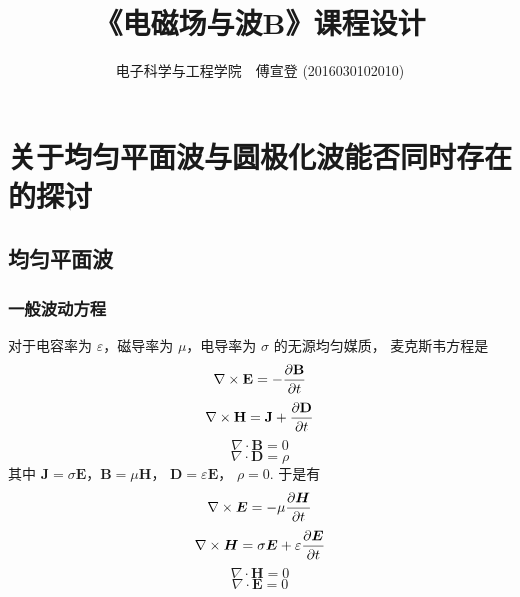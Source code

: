 \documentclass[UTF8,linespread=1.236]{ctexart}
\newcommand\cu[1]{\boldsymbol{#1}}
\newcommand\pypx[2]{{{\partial {#1}} \over {\partial {#2}}}}
\begin{document}
\title{《电磁场与波B》课程设计}
\author{电子科学与工程学院\ \ 傅宣登 (2016030102010)}

\maketitle

\section{关于均匀平面波与圆极化波能否同时存在的探讨}

\subsection{均匀平面波}

\subsubsection{一般波动方程}

对于电容率为 $\varepsilon$，磁导率为 $\mu$，电导率为 $\sigma$
的无源均匀媒质，
麦克斯韦方程是
\begin{equation}%
    \nabla \times \mathbf{E} = - \pypx{\mathbf{B}}{t}
\end{equation}
\begin{equation}
    \nabla \times \mathbf{H} = \mathbf{J} + \pypx{\mathbf{D}}{t}
\end{equation}
\begin{equation}
    \nabla \cdot \mathbf{B} = 0
\end{equation}
\begin{equation}
    \nabla \cdot \mathbf{D} = \rho
\end{equation}
其中 $\mathbf{J} = \sigma\mathbf{E}$，$\cu{B} = \mu\cu{H}$，
$\cu{D} = \varepsilon\cu{E}$，
$\rho = 0$. 于是有
\begin{equation}
    \label{eq81}
    \nabla \times \cu{E} = -\mu \pypx{\cu{H}}{t}
\end{equation}
\begin{equation}
    \label{eq82}
    \nabla \times \cu{H} = \sigma\cu{E} + \varepsilon\pypx{\cu{E}}{t}
\end{equation}
\begin{equation}
    \label{eq83}
    \nabla \cdot \cu{H} = 0
\end{equation}
\begin{equation}
    \label{eq84}
    \nabla \cdot \cu{E} = 0
\end{equation}
\end{document}
